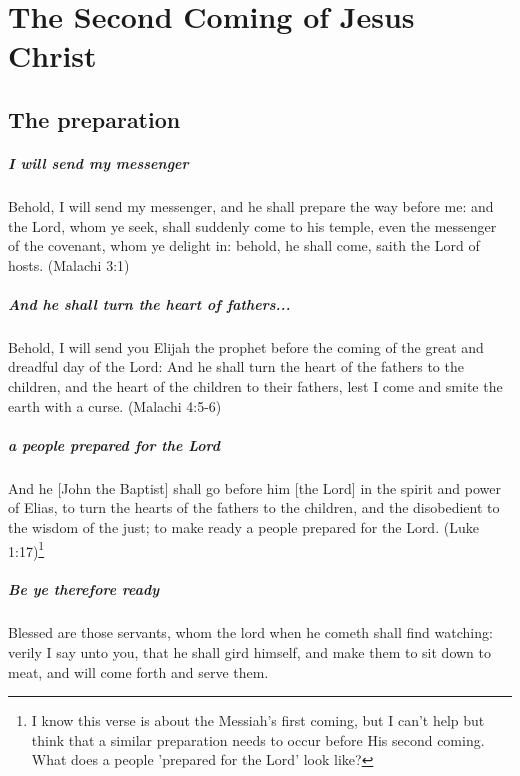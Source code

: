 \chapter{The Second Coming of Jesus Christ}

\section{The preparation}

\paragraph{I will send my messenger}
Behold, I will send my messenger, and he shall prepare the way before me: and the Lord, whom ye seek, shall suddenly come to his temple, even the messenger of the covenant, whom ye delight in: behold, he shall come, saith the Lord of hosts. (Malachi 3:1)

\paragraph{And he shall turn the heart of fathers...}
Behold, I will send you Elijah the prophet before the coming of the great and dreadful day of the Lord: And he shall turn the heart of the fathers to the children, and the heart of the children to their fathers, lest I come and smite the earth with a curse. (Malachi 4:5-6)

\paragraph{a people prepared for the Lord}
And he [John the Baptist] shall go before him [the Lord] in the spirit and power of Elias, to turn the hearts of the fathers to the children, and the disobedient to the wisdom of the just; to make ready a people prepared for the Lord. (Luke 1:17)\footnote{I know this verse is about the Messiah's first coming, but I can't help but think that a similar preparation needs to occur before His second coming. What does a people 'prepared for the Lord' look like?}

\paragraph{Be ye therefore ready}
Blessed are those servants, whom the lord when he cometh shall find watching: verily I say unto you, that he shall gird himself, and make them to sit down to meat, and will come forth and serve them.

